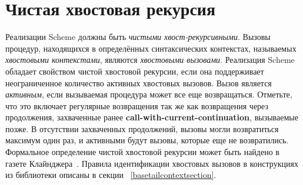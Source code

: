 \section{Чистая хвостовая рекурсия}
\label{proper tail recursion}

Реализации Scheme должны быть {\em чистыми хвост-рекурсивными}. Вызовы процедур, находящихся в определённых синтаксических контекстах, называемых
\textit{хвостовыми контекстами}, являются \textit{хвостовыми
  вызовами}. Реализация Scheme обладает свойством чистой хвостовой
рекурсии, если она поддерживает неограниченное количество активных хвостовых вызовов. Вызов
является {\em активным}, если вызываемая процедура может все еще возвращаться. Отметьте, что это
включает регулярные возвращения так же как возвращения через продолжения, захваченные ранее
{\bfseries\cf call-with-current-continuation}, вызываемые позже. В отсутствии захваченных
продолжений, вызовы могли возвратиться максимум один раз, и активными будут вызовы, которые еще
не возвратились. Формальное определение чистой хвостовой рекурсии может быть найдено в газете
Клайнджера~\cite{propertailrecursion}. Правила идентификации хвостовых вызовов в конструкциях из
библиотеки \textbf{} описаны в секции ~\ref{basetailcontextsection}.

